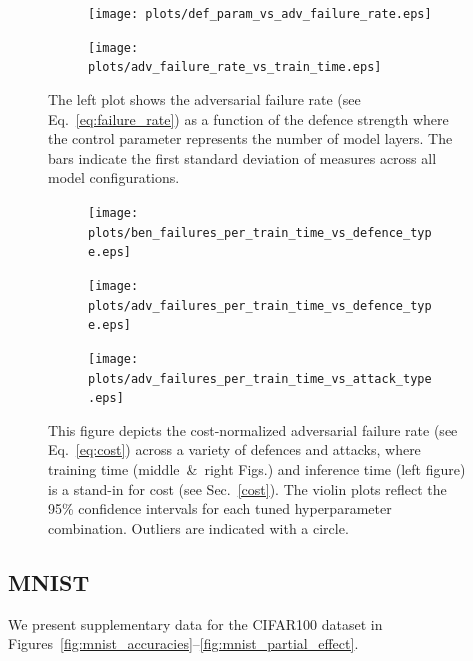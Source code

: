 \begin{figure}[!h]
    \centering
    \begin{subfigure}
        \centering
        \texttt{[image: plots/def\_param\_vs\_adv\_failure\_rate.eps]}
    \end{subfigure}
    \begin{subfigure}
        \centering
        \texttt{[image: plots/adv\_failure\_rate\_vs\_train\_time.eps]}
    \end{subfigure}
    \caption{The left plot shows the adversarial failure rate (see Eq.~\ref{eq:failure_rate}) as a function of the defence strength where the control parameter represents the number of model layers. The bars indicate the first standard deviation of measures across all model configurations.}
    \label{fig:failure_rate}
\end{figure}

\begin{figure}[!h]
    \centering
    \begin{subfigure}
        \centering
        \texttt{[image: plots/ben\_failures\_per\_train\_time\_vs\_defence\_type.eps]}
    \end{subfigure}
    \begin{subfigure}
        \centering
        \texttt{[image: plots/adv\_failures\_per\_train\_time\_vs\_defence\_type.eps]}
    \end{subfigure}
    \begin{subfigure}
        \centering
        \texttt{[image: plots/adv\_failures\_per\_train\_time\_vs\_attack\_type.eps]}
    \end{subfigure}
    \caption{This figure depicts the cost-normalized adversarial failure rate (see Eq.~\ref{eq:cost}) across a variety of defences and attacks, where training time (middle~\&~right Figs.) and inference time (left figure) is a stand-in for cost (see Sec.~\ref{cost}). The violin plots reflect the 95\% confidence intervals for each tuned hyperparameter combination. Outliers are indicated with a circle.}
    \label{fig:cifar100_failures_per_train_time}
\end{figure}



\clearpage
\subsection{MNIST}
We present supplementary data for the CIFAR100 dataset in Figures~\ref{fig:mnist_accuracies}--\ref{fig:mnist_partial_effect}.

